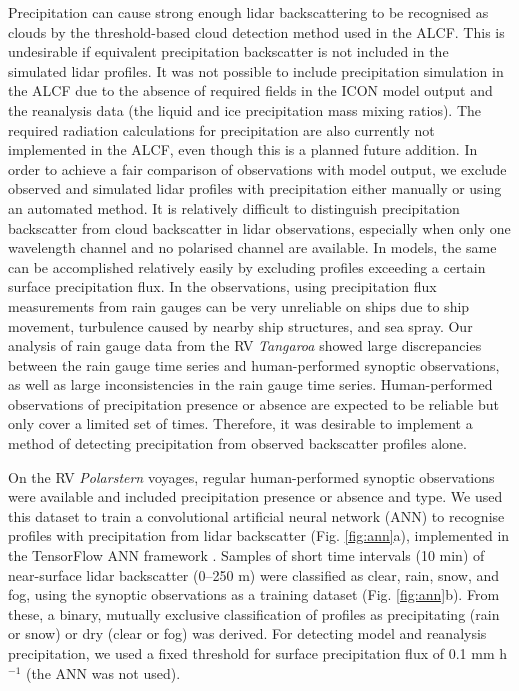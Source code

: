 \documentclass[12pt,a4paper]{article}
\begin{document}
Precipitation can cause strong enough lidar backscattering to be recognised as
clouds by the threshold-based cloud detection method used in the ALCF. This is
undesirable if equivalent precipitation backscatter is not included in the
simulated lidar profiles. It was not possible to include precipitation
simulation in the ALCF due to the absence of required fields in the ICON model
output and the reanalysis data (the liquid and ice precipitation mass mixing
ratios). The required radiation calculations for precipitation are also
currently not implemented in the ALCF, even though this is a planned future
addition.  In order to achieve a fair comparison of observations with model
output, we exclude observed and simulated lidar profiles with precipitation
either manually or using an automated method. It is relatively difficult to
distinguish precipitation backscatter from cloud backscatter in lidar
observations, especially when only one wavelength channel and no polarised
channel are available. In models, the same can be accomplished relatively
easily by excluding profiles exceeding a certain surface precipitation flux. In
the observations, using precipitation flux measurements from rain gauges can be
very unreliable on ships due to ship movement, turbulence caused by nearby ship
structures, and sea spray. Our analysis of rain gauge data from the RV
\emph{Tangaroa} showed large discrepancies between the rain gauge time series
and human-performed synoptic observations, as well as large inconsistencies in
the rain gauge time series. Human-performed observations of precipitation
presence or absence are expected to be reliable but only cover a limited set of
times. Therefore, it was desirable to implement a method of detecting
precipitation from observed backscatter profiles alone.

On the RV \emph{Polarstern} voyages, regular human-performed synoptic
observations were available and included precipitation presence or absence and
type. We used this dataset to train a convolutional artificial neural network
(ANN) to recognise profiles with precipitation from lidar backscatter (Fig.
\ref{fig:ann}a), implemented in the TensorFlow ANN framework
\citep{tensorflow}. Samples of short time intervals (10 min) of near-surface
lidar backscatter (0–250 m) were classified as clear, rain, snow, and fog,
using the synoptic observations as a training dataset (Fig.  \ref{fig:ann}b).
From these, a binary, mutually exclusive classification of profiles as
precipitating (rain or snow) or dry (clear or fog) was derived.  For detecting
model and reanalysis precipitation, we used a fixed threshold for surface
precipitation flux of 0.1 mm h$^{-1}$ (the ANN was not used).
\end{document}
